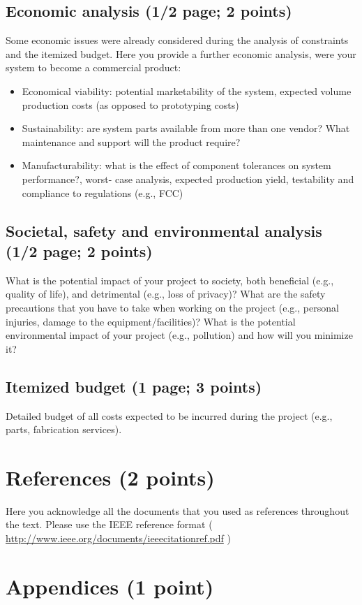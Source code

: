 \documentclass[letterpaper,12pt]{article}
\begin{document}
\subsection{Economic analysis (1/2 page; 2 points)}
Some economic issues were already considered during the analysis of
constraints and the itemized budget. Here you provide a further economic
analysis, were your system to become a commercial product:
\begin{itemize}
\item Economical viability: potential marketability of the system,
expected volume production costs (as opposed to prototyping costs)
\item Sustainability: are system parts available from more than
one vendor? What maintenance and support will the product require?
\item Manufacturability: what is the effect of component tolerances on
system performance?, worst- case analysis, expected production yield,
testability and compliance to regulations (e.g., FCC)
\end{itemize}

\subsection{Societal, safety and environmental analysis (1/2 page; 2 points)}
What is the potential impact of your project to society, both beneficial
(e.g., quality of life), and detrimental (e.g., loss of privacy)? What are
the safety precautions that you have to take when working on the project
(e.g., personal injuries, damage to the equipment/facilities)? What is
the potential environmental impact of your project (e.g., pollution)
and how will you minimize it?

\subsection{Itemized budget (1 page; 3 points)}
Detailed budget of all costs expected to be incurred during the project
(e.g., parts, fabrication services).

\section{References (2 points)}
Here you acknowledge all the documents that you used as references
throughout the text. Please use the IEEE reference format (
\url{http://www.ieee.org/documents/ieeecitationref.pdf} )

\section{Appendices (1 point)}
\end{document}
